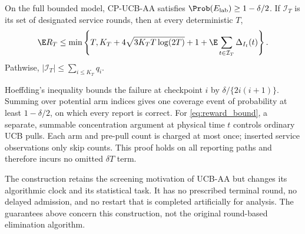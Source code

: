 \begin{proposition}
\label{prop:reporting}
On the full bounded model, CP-UCB-AA satisfies
$\Prob(E_{\rm lab})\ge1-\delta/2$. If $\mathcal I_T$ is its set of designated
service rounds, then at every deterministic $T$,
\begin{equation}
 \E R_T\le\min\left\{T,K_T+4\sqrt{3K_TT\log(2T)}+1+
                \E\sum_{t\in\mathcal I_T}\Delta_{I_t}(t)\right\}.
 \label{eq:reward_bound}
\end{equation}
Pathwise, $|\mathcal I_T|\le\sum_{i\le K_T}q_i$.
\end{proposition}

Hoeffding's inequality bounds the failure at checkpoint $i$ by
$\delta/\{2i(i+1)\}$. Summing over potential arm indices gives one coverage
event of probability at least $1-\delta/2$, on which every report is correct.
For \eqref{eq:reward_bound}, a separate, summable concentration argument at
physical time $t$ controls ordinary UCB pulls. Each arm and pre-pull count
is charged at most once; inserted service observations only skip counts.
This proof holds on all reporting paths and therefore incurs no omitted
$\delta T$ term. \suppproof

The construction retains the screening motivation of UCB-AA but changes its
algorithmic clock and its statistical task. It has no prescribed terminal round,
no delayed admission, and no restart that is completed artificially for analysis.
The guarantees above concern this construction, not the original round-based
elimination algorithm.
